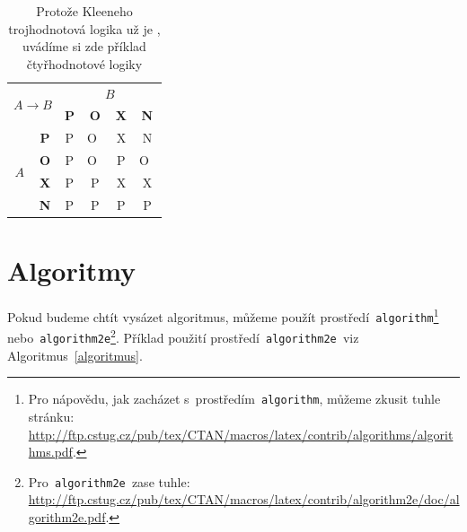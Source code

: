 \documentclass[a4paper, 11pt]{article}
\begin{document}
\begin{table}[ht]
            \begin{tabular}{|c|c|c|c|c|c|}
                \hline
                \multicolumn{2}{|c|}{\multirow{2}{*}{$A\rightarrow B$}} & \multicolumn{4}{c|}{$B$} \\
                \cline{3-6}
                \multicolumn{2}{|c|}{} & \textbf{P} & \textbf{O} & \textbf{X} & \textbf{N} \\
                \hline
                \multirow{4}{*}{$A$} & \textbf{P} & P & O~& X & N \\
                \cline{2-6} & \textbf{O} & P & O~& P & O~\\
                \cline{2-6} & \textbf{X} & P & P & X & X \\
                \cline{2-6} & \textbf{N} & P & P & P & P \\
                \hline
            \end{tabular}
            \caption{Protože Kleeneho trojhodnotová logika už je , uvádíme si zde příklad čtyřhodnotové logiky}
            \label{tabulka2}
        \end{table}

        \bigskip

\section{Algoritmy} \label{algoritmy}
    Pokud budeme chtít vysázet algoritmus, můžeme použít prostředí\texttt{ algorithm}\footnote{Pro nápovědu, jak zacházet s~prostředím\texttt{ algorithm}, můžeme zkusit tuhle stránku:\\ \href{http://ftp.cstug.cz/pub/tex/CTAN/macros/latex/contrib/algorithms/algorithms.pdf}{http://ftp.cstug.cz/pub/tex/CTAN/macros/latex/contrib/algorithms/algorithms.pdf}.}\texttt{ } nebo\texttt{ algorithm2e}\footnote{Pro\texttt{ algorithm2e }zase tuhle: \href{http://ftp.cstug.cz/pub/tex/CTAN/macros/latex/contrib/algorithm2e/doc/algorithm2e.pdf}{http://ftp.cstug.cz/pub/tex/CTAN/macros/latex/contrib/algorithm2e/doc/algorithm2e.pdf}.}.
    Příklad použití prostředí\texttt{ algorithm2e }viz Algoritmus~\ref{algoritmus}.

    \bigskip
\end{document}
